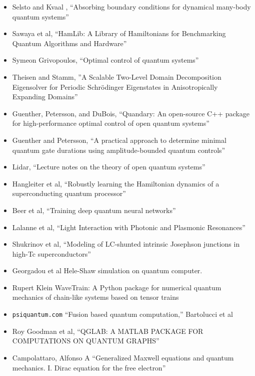 \documentclass[]{article}
\begin{document}
\begin{itemize}
\item Selsto and Kvaal
\cite{Selsto2010},
``Absorbing boundary conditions for dynamical many-body quantum systems''
\item Sawaya et al\cite{10313872},
  ``HamLib: A Library of Hamiltonians for Benchmarking Quantum Algorithms and Hardware''
\item Symeon Grivopoulos\cite{grivopoulos2005optimal},
 ``Optimal control of quantum systems''
\item Theisen and Stamm\cite{doi:10.1137/23M161848X},
  ''A Scalable Two-Level Domain Decomposition Eigensolver for Periodic Schrödinger Eigenstates in Anisotropically Expanding Domains''
\item Guenther, Petersson, and DuBois\cite{9651392},
  ``Quandary: An open-source C++ package for high-performance optimal control of open quantum systems''
\item Guenther and Petersson\cite{gunther2023practical},
``A practical approach to determine minimal quantum gate durations using amplitude-bounded quantum controls''
\item Lidar\cite{lidar2019lecture},
``Lecture notes on the theory of open quantum systems''
\item Hangleiter et al\cite{hangleiter2024robustly},
``Robustly learning the Hamiltonian dynamics of a superconducting quantum processor''
\item Beer et al\cite{beer2020training},
``Training deep quantum neural networks''
\item Lalanne et al\cite{LalanneETAL},
``Light Interaction with Photonic and Plasmonic Resonances''
\item Shukrinov et al\cite{shukrinov2016modeling},
``Modeling of LC-shunted intrinsic Josephson junctions in high-Tc superconductors''
\item Georgadou et al\cite{gopalakrishnan2024solving}
	Hele-Shaw simulation on quantum computer.
\item Rupert Klein\cite{riedel2023wavetrain} WaveTrain: A Python package for numerical quantum mechanics of chain-like systems based on tensor trains
\item {\verb=psiquantum.com=} \cite{bartolucci2023fusion}  ``Fusion based quantum computation,'' Bartolucci et al
\item Roy Goodman et al\cite{goodman2025qglab}, ``QGLAB: A MATLAB PACKAGE FOR COMPUTATIONS ON QUANTUM GRAPHS''
\item Campolattaro, Alfonso A ``Generalized Maxwell equations and quantum mechanics. I. Dirac equation for the free electron''

\end{itemize}
\end{document}
